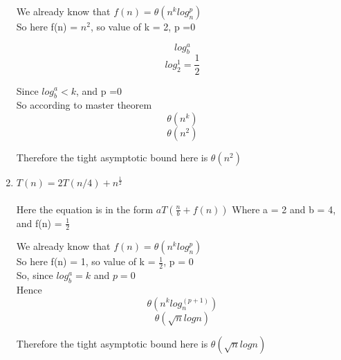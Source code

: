 \documentclass[11pt]{article}
\theoremstyle{definition}
\newcommand{\solution}{\medskip\noindent{\color{DarkBlue}\textbf{Solution:}}}
\begin{document}
\begin{enumerate}
    We already know that $f(n) = \theta(n^k log^p _n)$ \\

    So here f(n) = $n^2$, so value of k = 2, p =0

    \[ log^a_b \]
    \[ log^1_2 = \frac{1}{2} \]

    Since $log^a_b < k$, and p =0 \\
    So according to master theorem \\

    \[ \theta(n^k) \]
    \[ \theta(n^2) \]

    Therefore the tight asymptotic bound here is $\theta(n^2)$

    \item $T(n) = 2T(n/4) + n^{\frac{1}{2}}$ \\
    \solution \\

    Here the equation is in the form $aT(\frac{n}{b} + f(n))$
    Where a = 2 and b = 4, and f(n) = $\frac{1}{2}$

    We already know that $f(n) = \theta(n^k log^p _n)$ \\

    So here f(n) = 1, so value of k = $\frac{1}{2}$, p = 0 \\

    So, since $log^a_b = k$ and $p =0$ \\
    Hence \\

    \[ \theta(n^k log^(p+1)_n) \]
    \[ \theta(\sqrt{n}logn) \]

    Therefore the tight asymptotic bound here is $\theta(\sqrt{n}logn)$


\end{enumerate}
\end{document}
